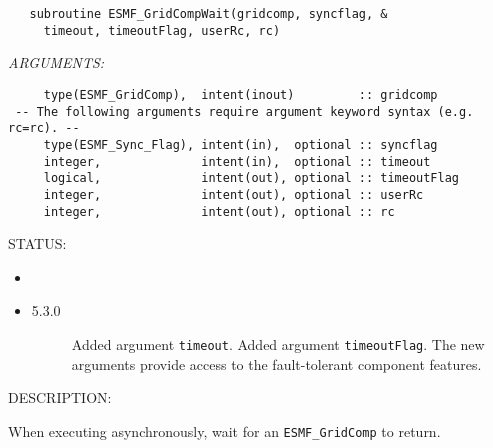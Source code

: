   
\begin{verbatim}   subroutine ESMF_GridCompWait(gridcomp, syncflag, &
     timeout, timeoutFlag, userRc, rc)\end{verbatim}{\em ARGUMENTS:}
\begin{verbatim}     type(ESMF_GridComp),  intent(inout)         :: gridcomp
 -- The following arguments require argument keyword syntax (e.g. rc=rc). --
     type(ESMF_Sync_Flag), intent(in),  optional :: syncflag
     integer,              intent(in),  optional :: timeout
     logical,              intent(out), optional :: timeoutFlag
     integer,              intent(out), optional :: userRc
     integer,              intent(out), optional :: rc\end{verbatim}
{\sf STATUS:}
   \begin{itemize}
   \item{}
   \item{}
   \begin{description}
   \item[5.3.0] Added argument {\tt timeout}.
                Added argument {\tt timeoutFlag}.
                The new arguments provide access to the fault-tolerant component
                features.
   \end{description}
   \end{itemize}
  
{\sf DESCRIPTION:\\ }


   When executing asynchronously, wait for an {\tt ESMF\_GridComp} to return.
  
